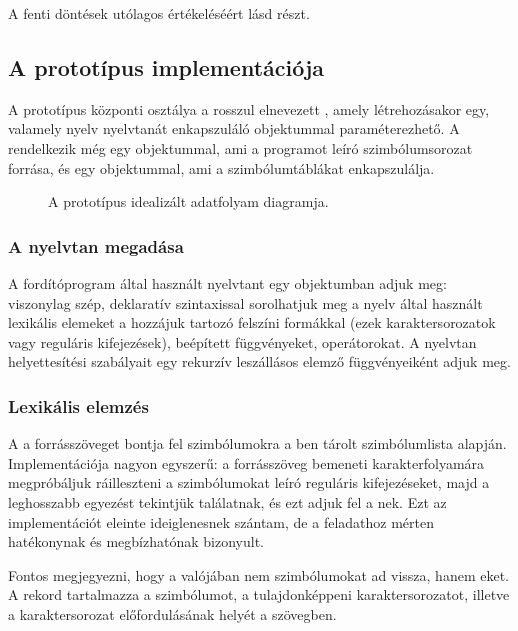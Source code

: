 A fenti döntések utólagos értékeléséért lásd  részt.


\subsection{A prototípus implementációja}

A prototípus központi osztálya a rosszul elnevezett , amely létrehozásakor egy, valamely nyelv nyelvtanát enkapszuláló  objektummal paraméterezhető.
A  rendelkezik még egy  objektummal, ami a programot leíró szimbólumsorozat forrása, és egy  objektummal, ami a szimbólumtáblákat enkapszulálja.

\begin{figure}[ht]
	\centering
	\resizebox{\textwidth}{!}{}
	\caption{A prototípus idealizált adatfolyam diagramja.}
\end{figure}


\subsubsection{A nyelvtan megadása}
A fordítóprogram által használt nyelvtant egy  objektumban adjuk meg: viszonylag szép, deklaratív szintaxissal sorolhatjuk meg a nyelv által használt lexikális elemeket a hozzájuk tartozó felszíni formákkal (ezek karaktersorozatok vagy reguláris kifejezések), beépített függvényeket, operátorokat.
A nyelvtan helyettesítési szabályait egy rekurzív leszállásos elemző függvényeiként adjuk meg.

\subsubsection{Lexikális elemzés}
A  a forrásszöveget bontja fel szimbólumokra a ben tárolt szimbólumlista alapján.
Implementációja nagyon egyszerű: a forrásszöveg bemeneti karakterfolyamára megpróbáljuk ráilleszteni a szimbólumokat leíró reguláris kifejezéseket, majd a leghosszabb egyezést tekintjük találatnak, és ezt adjuk fel a nek.
Ezt az implementációt eleinte ideiglenesnek szántam, de a feladathoz mérten hatékonynak és megbízhatónak bizonyult.

Fontos megjegyezni, hogy a  valójában nem szimbólumokat ad vissza, hanem eket.
A  rekord tartalmazza a szimbólumot, a tulajdonképpeni karaktersorozatot, illetve a karaktersorozat előfordulásának helyét a szövegben.

